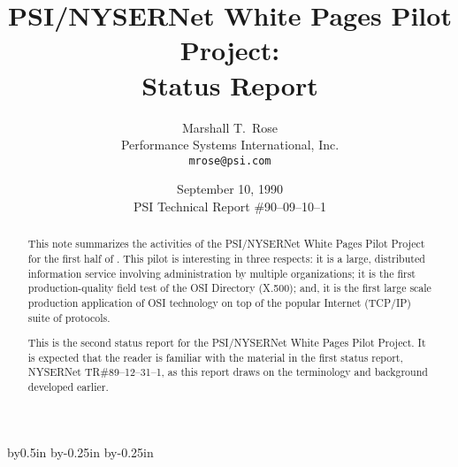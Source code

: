 



\advance\textwidth by0.5in
\advance\oddsidemargin by-0.25in
\advance\evensidemargin by-0.25in

\makeatletter
\let\titlep@ge=\titlepage
\def\titlepage{\titlep@ge \def\thefootnote{\fnsymbol{footnote}}}

\let\endtitlep@ge=\endtitlepage
\let\endtitlepage=\relax

\let\m@ketitle=\maketitle
\def\maketitle{\m@ketitle\let\titlepage=\relax\let\endtitlepage=\endtitlep@ge}
\makeatother



\title{PSI/NYSERNet White Pages Pilot Project:\\ Status Report}
\author{Marshall T.~Rose\\ Performance Systems International, Inc.\\
	\tt mrose@psi.com}
\date{September 10, 1990\\[0.25in]
PSI Technical Report \#90--09--10--1}
\maketitle

\begin{abstract}
This note summarizes the activities of the PSI/NYSERNet White Pages Pilot
Project for the first half of {}.
This pilot is interesting in three respects:
it is a large, distributed information service involving administration by
multiple organizations;
it is the first production-quality field test of the OSI Directory (X.500);
and,
it is the first large scale production application of OSI technology on top of
the popular Internet (TCP/IP) suite of protocols.

This is the second status report for the PSI/NYSERNet White Pages Pilot
Project.
It is expected that the reader is familiar with the material in the first
status report, NYSERNet TR\#89--12--31--1,
as this report draws on the terminology and background developed earlier.

\end{abstract}

\newpage\thispagestyle{empty}
\tableofcontents
{}



\showsummary


